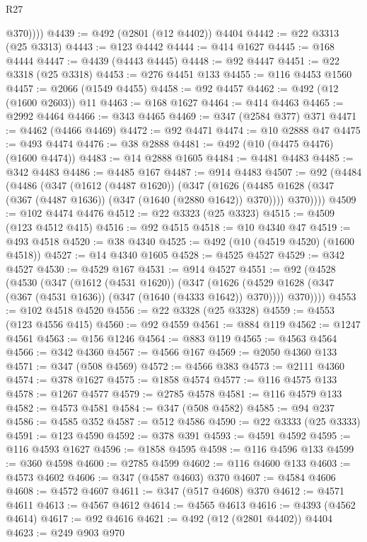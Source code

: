 \begin{lexlean}{R27}
\begin{coremodule}
            @370))))
@4439 := @492 (@2801 (@12 @4402)) @4404
@4442 := @22 @3313 (@25 @3313)
@4443 := @123 @4442
@4444 := @414 @1627
@4445 := @168 @4444
@4447 := @4439 (@4443 @4445)
@4448 := @92 @4447
@4451 := @22 @3318 (@25 @3318)
@4453 := @276 @4451 @133
@4455 := @116 @4453 @1560
@4457 := @2066 (@1549 @4455)
@4458 := @92 @4457
@4462 := @492 (@12 (@1600 @2603)) @11
@4463 := @168 @1627
@4464 := @414 @4463
@4465 := @2992 @4464
@4466 := @343 @4465
@4469 := @347 (@2584 @377) @371
@4471 := @4462 (@4466 @4469)
@4472 := @92 @4471
@4474 := @10 @2888 @47
@4475 := @493 @4474
@4476 := @38 @2888
@4481 := @492 (@10 (@4475 @4476) (@1600 @4474))
@4483 := @14 @2888 @1605
@4484 := @4481 @4483
@4485 := @342 @4483
@4486 := @4485 @167
@4487 := @914 @4483
@4507 := @92
    (@4484
      (@4486
        (@347
          (@1612 (@4487 @1620))
          (@347
            (@1626 (@4485 @1628 (@347 (@367 (@4487 @1636)) (@347 (@1640 (@2880 @1642)) @370))))
            @370))))
@4509 := @102 @4474 @4476
@4512 := @22 @3323 (@25 @3323)
@4515 := @4509 (@123 @4512 @415)
@4516 := @92 @4515
@4518 := @10 @4340 @47
@4519 := @493 @4518
@4520 := @38 @4340
@4525 := @492 (@10 (@4519 @4520) (@1600 @4518))
@4527 := @14 @4340 @1605
@4528 := @4525 @4527
@4529 := @342 @4527
@4530 := @4529 @167
@4531 := @914 @4527
@4551 := @92
    (@4528
      (@4530
        (@347
          (@1612 (@4531 @1620))
          (@347
            (@1626 (@4529 @1628 (@347 (@367 (@4531 @1636)) (@347 (@1640 (@4333 @1642)) @370))))
            @370))))
@4553 := @102 @4518 @4520
@4556 := @22 @3328 (@25 @3328)
@4559 := @4553 (@123 @4556 @415)
@4560 := @92 @4559
@4561 := @884 @119
@4562 := @1247 @4561
@4563 := @156 @1246
@4564 := @883 @119
@4565 := @4563 @4564
@4566 := @342 @4360
@4567 := @4566 @167
@4569 := @2050 @4360 @133
@4571 := @347 (@508 @4569)
@4572 := @4566 @383
@4573 := @2111 @4360
@4574 := @378 @1627
@4575 := @1858 @4574
@4577 := @116 @4575 @133
@4578 := @1267 @4577
@4579 := @2785 @4578
@4581 := @116 @4579 @133
@4582 := @4573 @4581
@4584 := @347 (@508 @4582)
@4585 := @94 @237
@4586 := @4585 @352
@4587 := @512 @4586
@4590 := @22 @3333 (@25 @3333)
@4591 := @123 @4590
@4592 := @378 @391
@4593 := @4591 @4592
@4595 := @116 @4593 @1627
@4596 := @1858 @4595
@4598 := @116 @4596 @133
@4599 := @360 @4598
@4600 := @2785 @4599
@4602 := @116 @4600 @133
@4603 := @4573 @4602
@4606 := @347 (@4587 @4603) @370
@4607 := @4584 @4606
@4608 := @4572 @4607
@4611 := @347 (@517 @4608) @370
@4612 := @4571 @4611
@4613 := @4567 @4612
@4614 := @4565 @4613
@4616 := @4393 (@4562 @4614)
@4617 := @92 @4616
@4621 := @492 (@12 (@2801 @4402)) @4404
@4623 := @249 @903 @970

\end{coremodule}
\end{lexlean}
